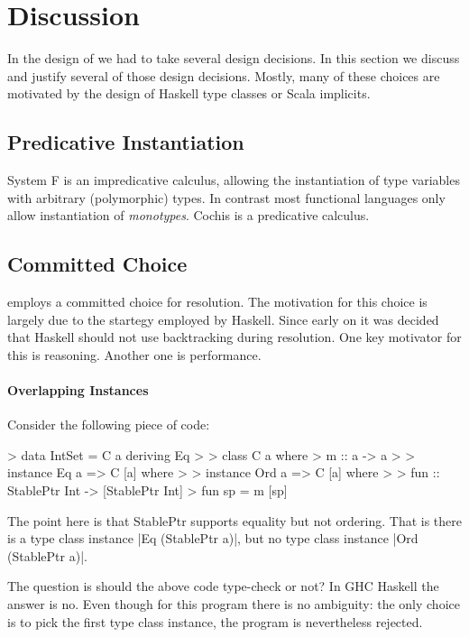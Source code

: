 \section{Discussion}

In the design of \name we had to take several design decisions. In
this section we discuss and justify several of those design decisions.
Mostly, many of these choices are motivated by the design of Haskell 
type classes or Scala implicits.



\subsection{Predicative Instantiation}

System F is an impredicative calculus, allowing the instantiation of type variables with 
arbitrary (polymorphic) types. In contrast most functional languages only allow instantiation 
of \emph{monotypes}. Cochis is a predicative calculus. 

\subsection{Committed Choice}

\name employs a committed choice for resolution. The motivation for this choice is 
largely due to the startegy employed by Haskell. Since early on it was decided that Haskell 
should not use backtracking during resolution. One key motivator for this is reasoning. Another 
one is performance.

\paragraph{Overlapping Instances}

Consider the following piece of code:


> data IntSet = C a deriving Eq
> 
> class C a where
>   m :: a -> a
>
> instance Eq a => C [a] where
> 
> instance Ord a => C [a] where
> 
> fun :: StablePtr Int -> [StablePtr Int]
> fun sp = m [sp]

The point here is that StablePtr supports equality but not ordering. That is there 
is a type class instance |Eq (StablePtr a)|, but no type class instance |Ord (StablePtr a)|. 

The question is should the above code type-check or not? In GHC Haskell the answer is no. 
Even though for this program there is no ambiguity: the only choice is to pick the first 
type class instance, the program is nevertheless rejected. 


